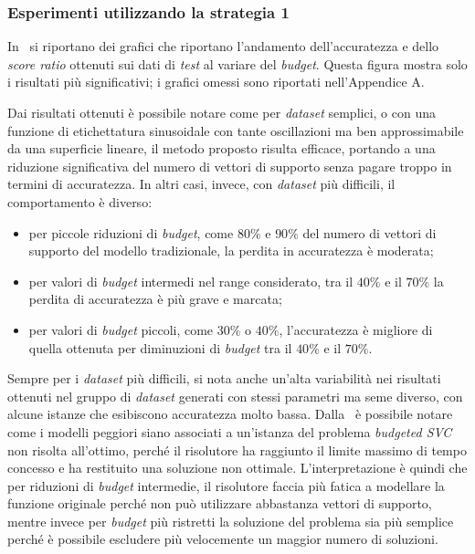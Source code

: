 \subsubsection{Esperimenti utilizzando la strategia 1}
In~ si riportano dei grafici che riportano l'andamento dell'accuratezza e dello \emph{score ratio} ottenuti sui dati di \emph{test} al variare del \emph{budget}.
Questa figura mostra solo i risultati più significativi; i grafici omessi sono riportati nell'Appendice A.

Dai risultati ottenuti è possibile notare come per \emph{dataset} semplici, o con una funzione di etichettatura sinusoidale con tante oscillazioni ma ben approssimabile da una superficie lineare, il metodo proposto risulta efficace, portando a una riduzione significativa del numero di vettori di supporto senza pagare troppo in termini di accuratezza.
In altri casi, invece, con \emph{dataset} più difficili, il comportamento è diverso:
\begin{itemize}
    \item per piccole riduzioni di \emph{budget}, come $80\%$ e $90\%$ del numero di vettori di supporto del modello tradizionale, la perdita in accuratezza è moderata;
    \item per valori di \emph{budget} intermedi nel range considerato, tra il $40\%$ e il $70\%$ la perdita di accuratezza è più grave e marcata;
    \item per valori di \emph{budget} piccoli, come $30\%$ o $40\%$, l'accuratezza è migliore di quella ottenuta per diminuzioni di \emph{budget} tra il $40\%$ e il $70\%$.
\end{itemize}
Sempre per i \emph{dataset} più difficili, si nota anche un'alta variabilità nei risultati ottenuti nel gruppo di \emph{dataset} generati con stessi parametri ma seme diverso, con alcune istanze che esibiscono accuratezza molto bassa.
Dalla~ è possibile notare come i modelli peggiori siano associati a un'istanza del problema \emph{budgeted SVC} non risolta all'ottimo, perché il risolutore ha raggiunto il limite massimo di tempo concesso e ha restituito una soluzione non ottimale.
L'interpretazione è quindi che per riduzioni di \emph{budget} intermedie, il risolutore faccia più fatica a modellare la funzione originale perché non può utilizzare abbastanza vettori di supporto, mentre invece per \emph{budget} più ristretti la soluzione del problema sia più semplice perché è possibile escludere più velocemente un maggior numero di soluzioni.

